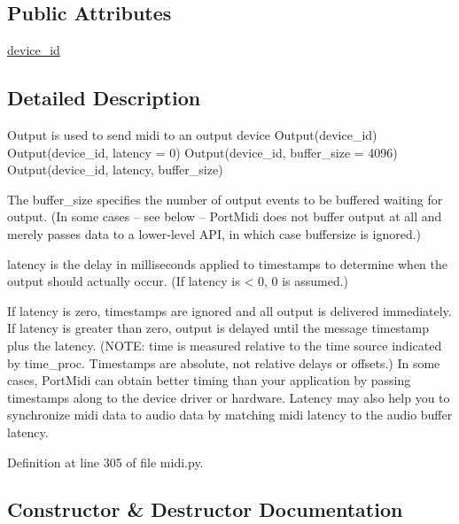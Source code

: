 \subsection*{Public Attributes}
\begin{DoxyCompactItemize}
\item 
\hyperlink{classpyportmidi_1_1midi_1_1_output_a2740ce8bc8861bedab98a7e56f9cdeb9}{device\+\_\+id}
\end{DoxyCompactItemize}


\subsection{Detailed Description}
\begin{DoxyVerb}Output is used to send midi to an output device
Output(device_id)
Output(device_id, latency = 0)
Output(device_id, buffer_size = 4096)
Output(device_id, latency, buffer_size)

The buffer_size specifies the number of output events to be 
buffered waiting for output.  (In some cases -- see below -- 
PortMidi does not buffer output at all and merely passes data 
to a lower-level API, in which case buffersize is ignored.)

latency is the delay in milliseconds applied to timestamps to determine
when the output should actually occur. (If latency is < 0, 0 is 
assumed.)

If latency is zero, timestamps are ignored and all output is delivered
immediately. If latency is greater than zero, output is delayed until
the message timestamp plus the latency. (NOTE: time is measured 
relative to the time source indicated by time_proc. Timestamps are 
absolute, not relative delays or offsets.) In some cases, PortMidi 
can obtain better timing than your application by passing timestamps 
along to the device driver or hardware. Latency may also help you 
to synchronize midi data to audio data by matching midi latency to 
the audio buffer latency.\end{DoxyVerb}
 

Definition at line 305 of file midi.\+py.



\subsection{Constructor \& Destructor Documentation}
